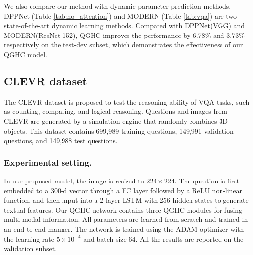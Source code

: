 \documentclass[runningheads]{llncs}
\begin{document}
We also compare our method with dynamic parameter prediction methods. DPPNet \cite{noh2016image} (Table \ref{tab:no_attention}) and MODERN \cite{de2017modulating} (Table \ref{tab:vqa}) are two state-of-the-art dynamic learning methods.
Compared with DPPNet(VGG) and MODERN(ResNet-152), QGHC improves the performance by 6.78\% and 3.73\% respectively on the test-dev subset, which demonstrates the effectiveness of our QGHC model.


\subsection{CLEVR dataset}

The CLEVR dataset \cite{johnson2016clevr} is proposed to test the reasoning ability of VQA tasks, such as counting, comparing, and logical reasoning. Questions and images from CLEVR are generated by a simulation engine that randomly combines 3D objects. This dataset contains 699,989 training questions, 149,991 validation questions, and 149,988 test questions. 


\subsubsection{Experimental setting.}

In our proposed model, the image is resized to $224\times 224$. The question is first embedded to a 300-d vector through a FC layer followed by a ReLU non-linear function, and then input into a 2-layer LSTM with 256 hidden states to generate textual features. Our QGHC network contains three QGHC modules for fusing multi-modal information. All parameters are learned from scratch and trained in an end-to-end manner. The network is trained using the ADAM optimizer with the learning rate $5\times 10^{-4}$ and batch size 64. All the results are reported on the validation subset.
\end{document}
